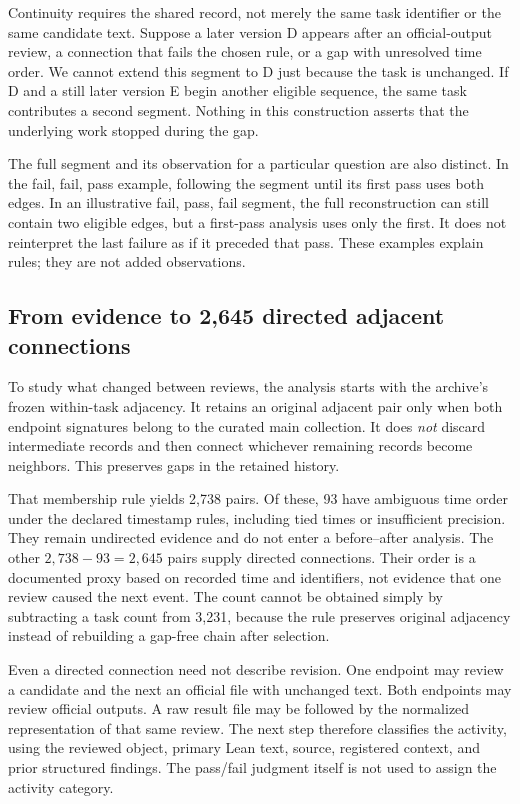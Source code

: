 Continuity requires the shared record, not merely the same task identifier or the same candidate text. Suppose a later version D appears after an official-output review, a connection that fails the chosen rule, or a gap with unresolved time order. We cannot extend this segment to D just because the task is unchanged. If D and a still later version E begin another eligible sequence, the same task contributes a second segment. Nothing in this construction asserts that the underlying work stopped during the gap.

The full segment and its observation for a particular question are also distinct. In the fail, fail, pass example, following the segment until its first pass uses both edges. In an illustrative fail, pass, fail segment, the full reconstruction can still contain two eligible edges, but a first-pass analysis uses only the first. It does not reinterpret the last failure as if it preceded that pass. These examples explain rules; they are not added observations.

\subsection{From evidence to 2,645 directed adjacent connections}
\label{subsec:adjacency}
To study what changed between reviews, the analysis starts with the archive's frozen within-task adjacency. It retains an original adjacent pair only when both endpoint signatures belong to the curated main collection. It does \emph{not} discard intermediate records and then connect whichever remaining records become neighbors. This preserves gaps in the retained history.

That membership rule yields 2,738 pairs. Of these, 93 have ambiguous time order under the declared timestamp rules, including tied times or insufficient precision. They remain undirected evidence and do not enter a before--after analysis. The other $2,738-93=2,645$ pairs supply directed connections. Their order is a documented proxy based on recorded time and identifiers, not evidence that one review caused the next event. The count cannot be obtained simply by subtracting a task count from 3,231, because the rule preserves original adjacency instead of rebuilding a gap-free chain after selection.

Even a directed connection need not describe revision. One endpoint may review a candidate and the next an official file with unchanged text. Both endpoints may review official outputs. A raw result file may be followed by the normalized representation of that same review. The next step therefore classifies the activity, using the reviewed object, primary Lean text, source, registered context, and prior structured findings. The pass/fail judgment itself is not used to assign the activity category.

